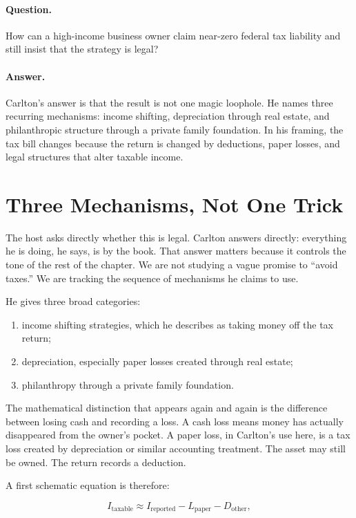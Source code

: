 \paragraph{Question.}
How can a high-income business owner claim near-zero federal tax liability and still insist that the strategy is legal?

\paragraph{Answer.}
Carlton's answer is that the result is not one magic loophole. He names three recurring mechanisms: income shifting, depreciation through real estate, and philanthropic structure through a private family foundation. In his framing, the tax bill changes because the return is changed by deductions, paper losses, and legal structures that alter taxable income.

\section{Three Mechanisms, Not One Trick}

The host asks directly whether this is legal. Carlton answers directly: everything he is doing, he says, is by the book. That answer matters because it controls the tone of the rest of the chapter. We are not studying a vague promise to ``avoid taxes.'' We are tracking the sequence of mechanisms he claims to use.

He gives three broad categories:

\begin{enumerate}
\item income shifting strategies, which he describes as taking money off the tax return;
\item depreciation, especially paper losses created through real estate;
\item philanthropy through a private family foundation.
\end{enumerate}

The mathematical distinction that appears again and again is the difference between losing cash and recording a loss. A cash loss means money has actually disappeared from the owner's pocket. A paper loss, in Carlton's use here, is a tax loss created by depreciation or similar accounting treatment. The asset may still be owned. The return records a deduction.

A first schematic equation is therefore:

\begin{equation}
I_{\mathrm{taxable}}
\approx
I_{\mathrm{reported}}
-
L_{\mathrm{paper}}
-
D_{\mathrm{other}},
\end{equation}


